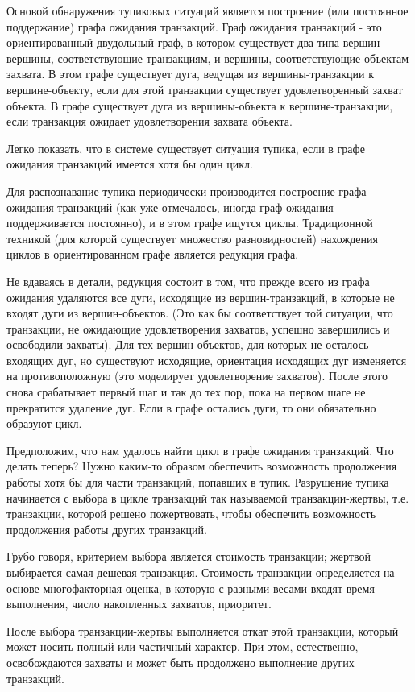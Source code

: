 Основой обнаружения тупиковых ситуаций является построение (или постоянное поддержание) графа ожидания транзакций. Граф ожидания транзакций - это ориентированный двудольный граф, в котором существует два типа вершин - вершины, соответствующие транзакциям, и вершины, соответствующие объектам захвата. В этом графе существует дуга, ведущая из вершины-транзакции к вершине-объекту, если для этой транзакции существует удовлетворенный захват объекта. В графе существует дуга из вершины-объекта к вершине-транзакции, если транзакция ожидает удовлетворения захвата объекта.

Легко показать, что в системе существует ситуация тупика, если в графе ожидания транзакций имеется хотя бы один цикл.

Для распознавание тупика периодически производится построение графа ожидания транзакций (как уже отмечалось, иногда граф ожидания поддерживается постоянно), и в этом графе ищутся циклы. Традиционной техникой (для которой существует множество разновидностей) нахождения циклов в ориентированном графе является редукция графа.

Не вдаваясь в детали, редукция состоит в том, что прежде всего из графа ожидания удаляются все дуги, исходящие из вершин-транзакций, в которые не входят дуги из вершин-объектов. (Это как бы соответствует той ситуации, что транзакции, не ожидающие удовлетворения захватов, успешно завершились и освободили захваты). Для тех вершин-объектов, для которых не осталось входящих дуг, но существуют исходящие, ориентация исходящих дуг изменяется на противоположную (это моделирует удовлетворение захватов). После этого снова срабатывает первый шаг и так до тех пор, пока на первом шаге не прекратится удаление дуг. Если в графе остались дуги, то они обязательно образуют цикл.

Предположим, что нам удалось найти цикл в графе ожидания транзакций. Что делать теперь? Нужно каким-то образом обеспечить возможность продолжения работы хотя бы для части транзакций, попавших в тупик. Разрушение тупика начинается с выбора в цикле транзакций так называемой транзакции-жертвы, т.е. транзакции, которой решено пожертвовать, чтобы обеспечить возможность продолжения работы других транзакций.

Грубо говоря, критерием выбора является стоимость транзакции; жертвой выбирается самая дешевая транзакция. Стоимость транзакции определяется на основе многофакторная оценка, в которую с разными весами входят время выполнения, число накопленных захватов, приоритет.

После выбора транзакции-жертвы выполняется откат этой транзакции, который может носить полный или частичный характер. При этом, естественно, освобождаются захваты и может быть продолжено выполнение других транзакций.

